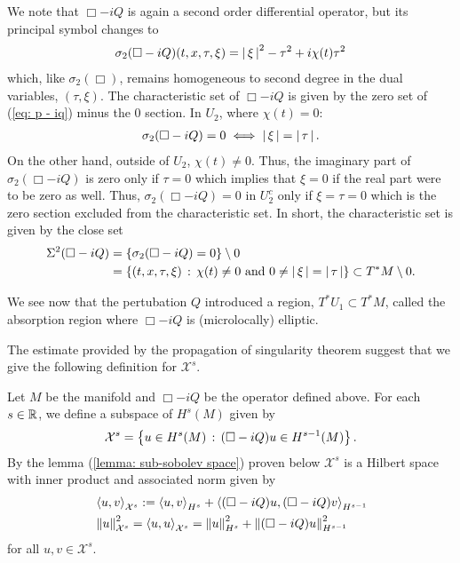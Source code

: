 \documentclass[12pt]{article}
\begin{document}
We note that $\Box - iQ$ is again a second order differential operator, but its principal symbol changes to 
\begin{align}
\sigma_2(\Box - iQ)(t, x, \tau, \xi) = \abs{\xi}^2 - \tau^2 + i \chi(t) \tau^2 \label{eq: p - iq} 
\end{align}
which, like $\sigma_2(\Box)$, remains homogeneous to second degree in the dual variables, $(\tau, \xi)$. The characteristic set of $\Box - iQ$ is given by the zero set of (\ref{eq: p - iq}) minus the 0 section. In $U_2$, where $\chi(t) = 0$: 
\begin{align*}
\sigma_2(\Box - iQ) = 0 \iff \abs{\xi} = \abs{\tau}. 
\end{align*} 
On the other hand, outside of $U_2$, $\chi(t) \neq 0 $. Thus, the imaginary part of $\sigma_2(\Box - iQ)$ is zero only if $\tau = 0$ which implies that $\xi = 0$ if the real part were to be zero as well. Thus, $\sigma_2(\Box - iQ) = 0$ in $U_2^c$ only if $\xi = \tau = 0$ which is the zero section excluded from the characteristic set. In short, the characteristic set is given by the close set 
\begin{align*}
\Char^2(\Box - iQ) 
& = \set{\sigma_2(\Box - iQ) = 0} \setminus 0 \\
& = \set{(t, x, \tau, \xi) \wh \chi(t) \neq 0 \text{ and }  0 \neq \abs{\xi} = \abs{\tau}} \subset T^* M \setminus 0. 
\end{align*}

We see now that the pertubation $Q$ introduced a region, $T^*U_1 \subset T^*M$, called the absorption region where $\Box - iQ$ is (microlocally) elliptic. 


The estimate provided by the propagation of singularity theorem suggest that we give the following definition for $\mathcal{X}^s$. 

\begin{fdefinition}
    Let $M$ be the manifold and $\Box -i Q$ be the operator defined above. For each $s \in \R$, we define a subspace of $H^{s}(M)$ given by
    \begin{align*}
    \mathcal{X}^s = \set{u \in H^s(M) \wh (\Box - i Q)u \in H^{s - 1}(M)}. 
    \end{align*}
    By the lemma (\ref{lemma: sub-sobolev space}) proven below $\mathcal{X}^s$ is a Hilbert space with inner product and associated norm given by 
    \begin{align*}
    &\inprod[u, v]_{\mathcal{X}^s} := \inprod[u, v]_{H^{s}} + \inprod[(\Box - iQ)u, (\Box - iQ)v]_{H^{s -1}} \\
    & \norm[u]_{\mathcal{X}^s}^2 = \inprod[u, u]_{\mathcal{X}^s} = \norm[u]_{H^s}^2 + \norm[(\Box - iQ)u]_{H^{s - 1}}^2
    \end{align*}
    for all $u, v \in \mathcal{X}^s$. 
\end{fdefinition}
\end{document}
